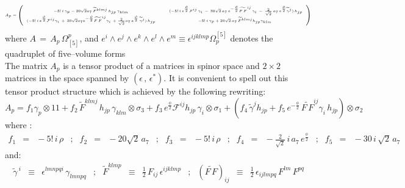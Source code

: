 \documentclass[a4paper,11pt]{article}
\def\tilde{\widetilde}
\begin{document}
\begin{equation}
\hbox{{\tiny $ \! A_{p} =  \left( \begin{array}{ccc}
     - 5! \, i \, \gamma_{p} -20 \sqrt{2} a_7 \, \tilde{F}^{klmj} \, h_{jp} \, \gamma_{klm}  & &
       (-5! \, i \, e^{\frac{\phi}{2}} \mathcal{F}^{ij} \, \gamma_{i} \, - \, 30 \sqrt{2} \, a_7 \, e^{- \frac{\phi}{2}} {\tilde{F \, F}}^{ij} \, \gamma_i \, - \, \frac{2}{\sqrt{2}} \, a_7 \, e^{\frac{\phi}{2}} {\tilde \gamma}^{j}) \, h_{jp} \\
      (-5! \, i \, e^{\frac{\phi}{2}} \mathcal{F}^{ij} \gamma_i \, + \, 30 \sqrt{2} a_7 e^{-\frac{\phi}{2}}  {\tilde{F \, F}}^{ij} \gamma_i \, + \frac{2}{\sqrt{2}} a_7 \, e^{\frac{\phi}{2}} \, {\tilde \gamma}^{j})\, h_{jp} & &
       - 5! \, i \, \gamma_{p} + 20 \sqrt{2} \, a_7 \, {\tilde F}^{klmj} h_{jp}\gamma_{klm} \
 \end{array}\right)$}}
\label{matrix A}
\end{equation}
where $A \, = \, A_{p} \, \Omega_{[5]}^{p} $, and  $e^i \wedge e^j \wedge e^k \wedge e^l \wedge e^{m} \equiv \epsilon^{ijklmp}\Omega_{p}^{[5]}$ denotes the quadruplet of five--volume forms\\
The matrix $A_{p}$ is a tensor product of a matrices in spinor space and $2\times 2$ matrices
in the space spanned by $\left( \epsilon \, , \, \epsilon ^{*}\right)
$. It is convenient to spell out this tensor product structure which
is achieved by the following rewriting:
\begin{equation}
A_{p} \! = \! f_{1}  \gamma_{p} \otimes 1 \! \! 1 + f_{2} \, \tilde{F}^{klmj} \, h_{jp} \, \gamma_{klm} \otimes \sigma_{3} + f_{3} \, e^{\frac{\phi}{2}} \mathcal{F}^{ij} h_{jp} \, \gamma_i \otimes \sigma_{1} + (f_4 \,{\tilde \gamma}^{j} h_{jp} + f_5 \, e^{-\frac{\phi}{2}} \, {\tilde{F \, F}}^{ij} \gamma_i \, h_{jp}) \otimes \sigma_2
\label{concis Ak}
\end{equation}
where :
\begin{equation}
\begin{array}{rclcrclcrclcrclcrcl}
\!\!\! f_{1} \!\!\! &=& \!\!\! -5! \, i \, \rho \!\!\! &;& \!\!\! f_{2} \!\!\! &=& \!\!\! - 20 \sqrt{2} \, a_7   \!\!\! &;& \!\!\!
\! f_{3} \!\!\! &=& \!\!\! -5! \, i \, \rho \!\!\! &;& \!\!\! f_{4} \!\!\! &=& \!\!\! - \frac{2}{\sqrt{2}} \, i \, a_7\,  e^{\frac{\phi}{2}} \!\!\! &;& \!\!\! f_{5} \!\!\! &=& \!\!\! -30 \, i \, \sqrt{2} \, a_7
\end{array}
\label{gli f}
\end{equation}
and:
\begin{equation}
\begin{array}{rclcrclcrcl}
\tilde{\gamma} \, ^{i} & \equiv & \epsilon^{lmnpqi} \, \gamma_{lmnpq}
&;&
{\tilde F}^{klmp} & \equiv & \frac{1}{2} \, F_{ij} \, \epsilon^{ijklmp} &;&
({\tilde {F \, F}})_{ij} & \equiv & \frac{1}{2} \, \epsilon_{ijlmpq} \, F^{lm} \, F^{pq}
\end{array}
\label{pi 12}
\end{equation}
\end{document}
